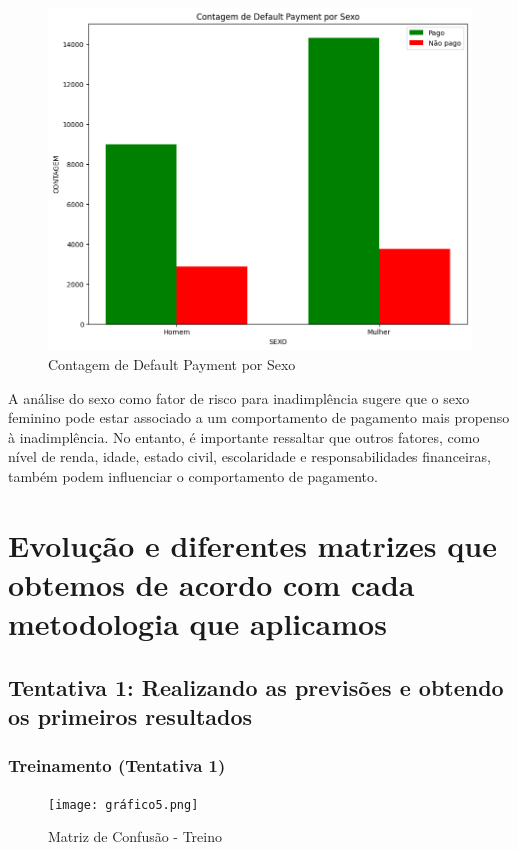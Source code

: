 \documentclass{abntpuc}
\begin{document}
\begin{figure}[H]
    \centering
    \includegraphics[width=\textwidth]{grafico4.png}
    \caption{Contagem de Default Payment por Sexo}
    \label{fig:grafico4}
\end{figure}

A análise do sexo como fator de risco para inadimplência sugere que o sexo feminino pode estar associado a um comportamento de pagamento mais propenso à inadimplência. No entanto, é importante ressaltar que outros fatores, como nível de renda, idade, estado civil, escolaridade e responsabilidades financeiras, também podem influenciar o comportamento de pagamento.

\chapter{Evolução e diferentes matrizes que obtemos de acordo com cada metodologia que aplicamos}

\section{Tentativa 1: Realizando as previsões e obtendo os primeiros resultados}

\subsection*{\centering\large\textbf{Treinamento (Tentativa 1)}}

\begin{figure}[H]
    \centering
    \texttt{[image: gráfico5.png]}
    \caption{Matriz de Confusão - Treino}
    \label{fig:grafico5}
\end{figure}
\end{document}
